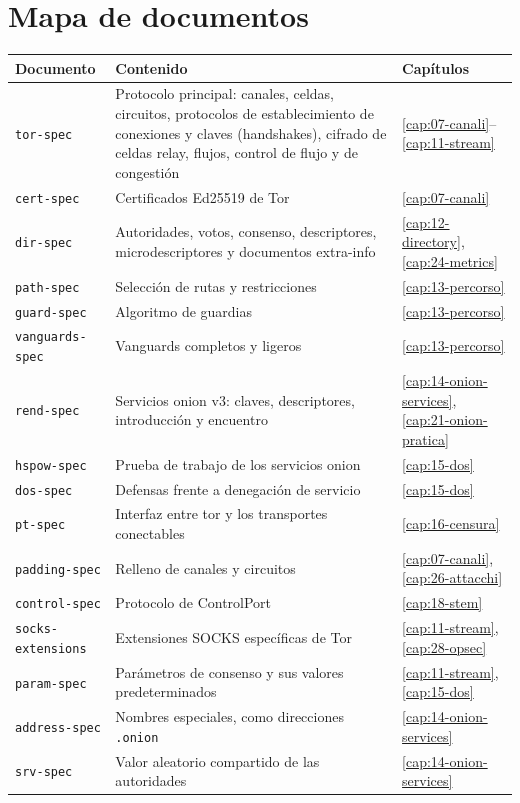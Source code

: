 \section{Mapa de documentos}\label{sec:C-mappa}

\begin{center}\small
\begin{tabularx}{\textwidth}{@{}l>{\raggedright\arraybackslash}Xl@{}}
\toprule
Documento & Contenido & Capítulos \\
\midrule
\texttt{tor-spec} & Protocolo principal: canales, celdas, circuitos, protocolos de establecimiento de conexiones y claves (handshakes), cifrado de celdas relay, flujos, control de flujo y de congestión & \ref{cap:07-canali}--\ref{cap:11-stream} \\
\texttt{cert-spec} & Certificados Ed25519 de Tor & \ref{cap:07-canali} \\
\texttt{dir-spec} & Autoridades, votos, consenso, descriptores, microdescriptores y documentos extra-info & \ref{cap:12-directory}, \ref{cap:24-metrics} \\
\texttt{path-spec} & Selección de rutas y restricciones & \ref{cap:13-percorso} \\
\texttt{guard-spec} & Algoritmo de guardias & \ref{cap:13-percorso} \\
\texttt{vanguards-spec} & Vanguards completos y ligeros & \ref{cap:13-percorso} \\
\texttt{rend-spec} & Servicios onion v3: claves, descriptores, introducción y encuentro & \ref{cap:14-onion-services}, \ref{cap:21-onion-pratica} \\
\texttt{hspow-spec} & Prueba de trabajo de los servicios onion & \ref{cap:15-dos} \\
\texttt{dos-spec} & Defensas frente a denegación de servicio & \ref{cap:15-dos} \\
\texttt{pt-spec} & Interfaz entre tor y los transportes conectables & \ref{cap:16-censura} \\
\texttt{padding-spec} & Relleno de canales y circuitos & \ref{cap:07-canali}, \ref{cap:26-attacchi} \\
\texttt{control-spec} & Protocolo de ControlPort & \ref{cap:18-stem} \\
\texttt{socks-extensions} & Extensiones SOCKS específicas de Tor & \ref{cap:11-stream}, \ref{cap:28-opsec} \\
\texttt{param-spec} & Parámetros de consenso y sus valores predeterminados & \ref{cap:11-stream}, \ref{cap:15-dos} \\
\texttt{address-spec} & Nombres especiales, como direcciones \texttt{.onion} & \ref{cap:14-onion-services} \\
\texttt{srv-spec} & Valor aleatorio compartido de las autoridades & \ref{cap:14-onion-services} \\
\bottomrule
\end{tabularx}
\end{center}

